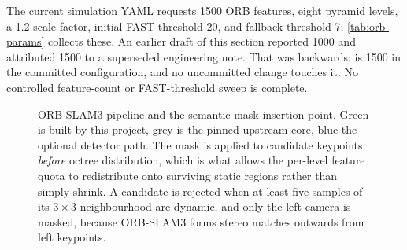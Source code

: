 The current simulation YAML requests \num{1500} ORB features, eight pyramid
levels, a 1.2 scale factor, initial FAST threshold 20, and fallback threshold 7;
\cref{tab:orb-params} collects these. An earlier draft of this section reported
\num{1000} and attributed \num{1500} to a superseded engineering note. That was
backwards:  is \num{1500} in the committed
configuration, and no uncommitted change touches it. No controlled feature-count
or FAST-threshold sweep is complete.

\begin{figure}[htbp]
  \centering
  \resizebox{\textwidth}{!}{}
  \caption{ORB-SLAM3 pipeline and the semantic-mask insertion point. Green is
  built by this project, grey is the pinned upstream core, blue the optional
  detector path. The mask is applied to candidate keypoints \emph{before} octree
  distribution, which is what allows the per-level feature quota to redistribute
  onto surviving static regions rather than simply shrink. A candidate is
  rejected when at least five samples of its $3\times3$ neighbourhood are
  dynamic, and only the left camera is masked, because ORB-SLAM3 forms stereo
  matches outwards from left keypoints.}
  \label{fig:orb-pipeline}
\end{figure}

